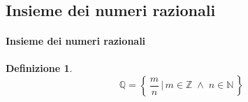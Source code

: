 \documentclass{article}
\theoremstyle{plain}
\theoremstyle{definition}
\newtheorem{defn}{Definizione}[section]
\theoremstyle{remark}
\begin{document}
\subsection{Insieme dei numeri razionali}

\vspace{10pt}

\paragraph{Insieme dei numeri razionali}
\begin{bxthm}
\begin{defn}
    \[\mathbb{Q}=\left\{\,\dfrac{m}{n}\,|\,m\in\mathbb{Z}\;\land\;n\in\mathbb{N}\,\right\}\]
\end{defn}
\end{bxthm}

\vspace{10pt}
\end{document}

